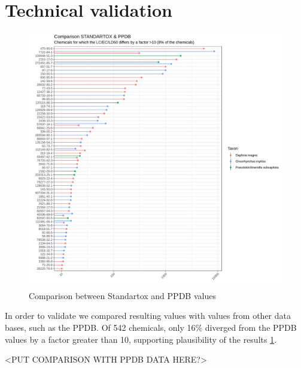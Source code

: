 
\section{Technical validation}


\begin{figure}
    \includegraphics[width=1\linewidth]{article/figures/Standartox_PPDB.png}
    \caption{
        Comparison between Standartox and PPDB values
    }
    \label{fig:standartox_ppdb_diff}
\end{figure}

In order to validate \standartox we compared resulting values with values from other data bases, such as the PPDB. Of 542 chemicals, only 16\% diverged from the PPDB values by a factor greater than 10, supporting plausibility of the \standartox results \ref{fig:standartox_ppdb_diff}.





<PUT COMPARISON WITH PPDB DATA HERE?>